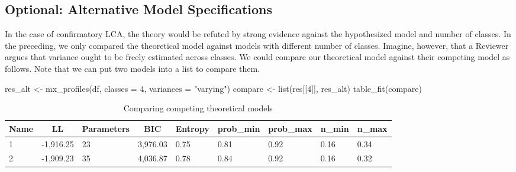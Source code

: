 \documentclass[
  man,floatsintext]{apa6}
\newenvironment{Shaded}{\begin{snugshade}}{\end{snugshade}}
\newcommand{\AttributeTok}[1]{\textcolor[rgb]{0.77,0.63,0.00}{#1}}
\newcommand{\DecValTok}[1]{\textcolor[rgb]{0.00,0.00,0.81}{#1}}
\newcommand{\FunctionTok}[1]{\textcolor[rgb]{0.00,0.00,0.00}{#1}}
\newcommand{\NormalTok}[1]{#1}
\newcommand{\OtherTok}[1]{\textcolor[rgb]{0.56,0.35,0.01}{#1}}
\newcommand{\StringTok}[1]{\textcolor[rgb]{0.31,0.60,0.02}{#1}}
\begin{document}
\hypertarget{optional-alternative-model-specifications}{%
\subsection{Optional: Alternative Model Specifications}\label{optional-alternative-model-specifications}}

In the case of confirmatory LCA, the theory would be refuted by strong evidence against the hypothesized model and number of classes.
In the preceding, we only compared the theoretical model against models with different number of classes.
Imagine, however, that a Reviewer argues that variance ought to be freely estimated across classes.
We could compare our theoretical model against their competing model as follows.
Note that we can put two models into a list to compare them.

\begin{Shaded}
\begin{Highlighting}[]
\NormalTok{res\_alt }\OtherTok{\textless{}{-}} \FunctionTok{mx\_profiles}\NormalTok{(df, }\AttributeTok{classes =} \DecValTok{4}\NormalTok{, }\AttributeTok{variances =} \StringTok{"varying"}\NormalTok{)}
\NormalTok{compare }\OtherTok{\textless{}{-}} \FunctionTok{list}\NormalTok{(res[[}\DecValTok{4}\NormalTok{]], res\_alt)}
\FunctionTok{table\_fit}\NormalTok{(compare)}
\end{Highlighting}
\end{Shaded}

\begin{table}[tbp]

\begin{center}
\begin{threeparttable}

\caption{\label{tab:tabfitcomp}Comparing competing theoretical models}

\begin{tabular}{lllllllll}
\toprule
Name & \multicolumn{1}{c}{LL} & \multicolumn{1}{c}{Parameters} & \multicolumn{1}{c}{BIC} & \multicolumn{1}{c}{Entropy} & \multicolumn{1}{c}{prob\_min} & \multicolumn{1}{c}{prob\_max} & \multicolumn{1}{c}{n\_min} & \multicolumn{1}{c}{n\_max}\\
\midrule
1 & -1,916.25 & 23 & 3,976.03 & 0.75 & 0.81 & 0.92 & 0.16 & 0.34\\
2 & -1,909.23 & 35 & 4,036.87 & 0.78 & 0.84 & 0.92 & 0.16 & 0.32\\
\bottomrule
\end{tabular}

\end{threeparttable}
\end{center}

\end{table}
\end{document}
